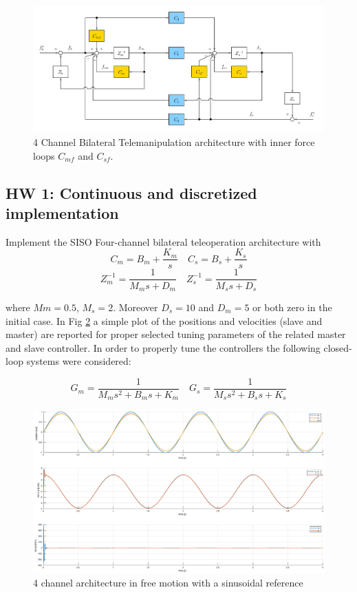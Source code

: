 \documentclass[a4paper,12pt]{article}
\begin{document}
\begin{figure}[H]
    \begin{center}
        \hspace*{-2cm}
        \includegraphics[scale=0.3]{images/four_channel.png}
    \end{center}
    \caption{4 Channel Bilateral Telemanipulation architecture with inner force loops $C_{mf}$ and $C_{sf}$.}
    \label{fig:four_channel}
\end{figure}

\subsection{HW 1: Continuous and discretized implementation}
Implement the SISO Four-channel bilateral teleoperation architecture with
\[
    C_m = B_m + \frac{K_m}{s} \quad
    C_s = B_s + \frac{K_s}{s}
\]
\[
    Z_m^{-1} = \frac{1}{M_ms + D_m} \quad
    Z_s^{-1} = \frac{1}{M_ss + D_s}
\]

\bigskip
\noindent where $Mm = 0.5$, $M_s = 2$. Moreover $D_s = 10$ and $D_m = 5$ or both zero in the initial case. In Fig \ref{fig:four_free} a simple plot of the positions and velocities (slave and master) are reported for proper selected tuning parameters of the related master and slave controller. In order to properly tune the controllers the following closed-loop systems were considered:

\[
G_m = \frac{1}{M_ms^2+B_ms+K_m} \quad
G_s = \frac{1}{M_ss^2+B_ss+K_s}
\]

\begin{figure}[H]
    \begin{center}
        \hspace*{-4.2cm}
        \includegraphics[scale=0.4]{images/four_free_motion.eps}
    \end{center}
    \caption{4 channel architecture in free motion with a sinusoidal reference}
    \label{fig:four_free}
\end{figure}
\end{document}
